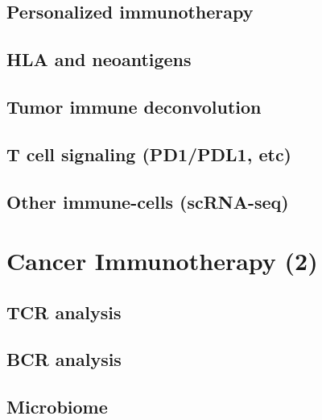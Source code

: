 \documentclass[]{book}
\begin{document}
\hypertarget{personalized-immunotherapy}{%
\section{Personalized immunotherapy}\label{personalized-immunotherapy}}

\hypertarget{hla-and-neoantigens}{%
\section{HLA and neoantigens}\label{hla-and-neoantigens}}

\hypertarget{tumor-immune-deconvolution}{%
\section{Tumor immune deconvolution}\label{tumor-immune-deconvolution}}

\hypertarget{t-cell-signaling-pd1pdl1-etc}{%
\section{T cell signaling (PD1/PDL1, etc)}\label{t-cell-signaling-pd1pdl1-etc}}

\hypertarget{other-immune-cells-scrna-seq}{%
\section{Other immune-cells (scRNA-seq)}\label{other-immune-cells-scrna-seq}}

\hypertarget{cancerimmuno2}{%
\chapter{Cancer Immunotherapy (2)}\label{cancerimmuno2}}

\hypertarget{tcr-analysis}{%
\section{TCR analysis}\label{tcr-analysis}}

\hypertarget{bcr-analysis}{%
\section{BCR analysis}\label{bcr-analysis}}

\hypertarget{microbiome}{%
\section{Microbiome}\label{microbiome}}
\end{document}
